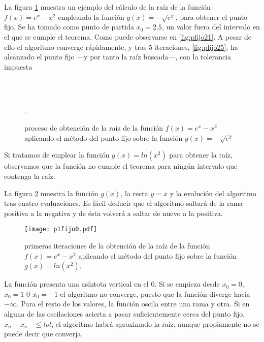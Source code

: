 La figura \ref{fig:pfijo2} muestra un ejemplo del cálculo de la raíz de la función $f(x)=e^x-x^2$ empleando la función $g(x)=-\sqrt{e^x}$, para obtener el punto fijo. Se ha tomado como punto de partida $x_0=2.5$, un valor fuera del intervalo en el que se cumple el teorema. Como puede observarse en \ref{fig:pfijo21}. A pesar de ello el algoritmo converge rápidamente, y tras 5 iteraciones, \ref{fig:pfijo25}, ha alcanzado el punto fijo ---y por tanto la raíz buscada---, con la tolerancia impuesta
  
\begin{figure}
\centering
{} \qquad
{}\\
\qquad
{}\\
\qquad
{}
\caption{proceso de obtención de la raíz de la función $f(x)=e^x-x^2$ aplicando el método del punto fijo sobre la función $g(x)=-\sqrt{e^x}$}.
\label{fig:pfijo2}
\end{figure}

Si tratamos de emplear la función $g(x)=ln(x^2)$ para obtener la raíz, observamos que la función no cumple el teorema para ningún intervalo que contenga la raíz. 

La figura \ref{fig:pfijo03} muestra la función $g(x)$, la recta $y=x$ y la evolución del algoritmo tras cuatro evaluaciones. Es fácil deducir que el algoritmo saltará de la rama positiva a la negativa y de ésta volverá a saltar de nuevo a la positiva. 

\begin{figure}[h]
\texttt{[image: p1fijo0.pdf]}
\caption{primeras iteraciones de la obtención de la raíz de la función $f(x)=e^x-x^2$ aplicando el método del punto fijo sobre la función $g(x)=ln(x^2)$.}
\label{fig:pfijo03}
\end{figure}

La función presenta una asíntota vertical en el $0$. Si se empieza desde $x_0=0$, $x_0=1$ 0 $x_0=-1$ el algoritmo no converge, puesto que la función diverge hacia $-\infty$. Para el resto de los valores, la función oscila entre una rama y otra. Si en alguna de las oscilaciones acierta a pasar suficientemente cerca del punto fijo, $x_n-x_{n-} \leq tol$, el algoritmo habrá aproximado la raíz, aunque propiamente no se puede decir que converja.

